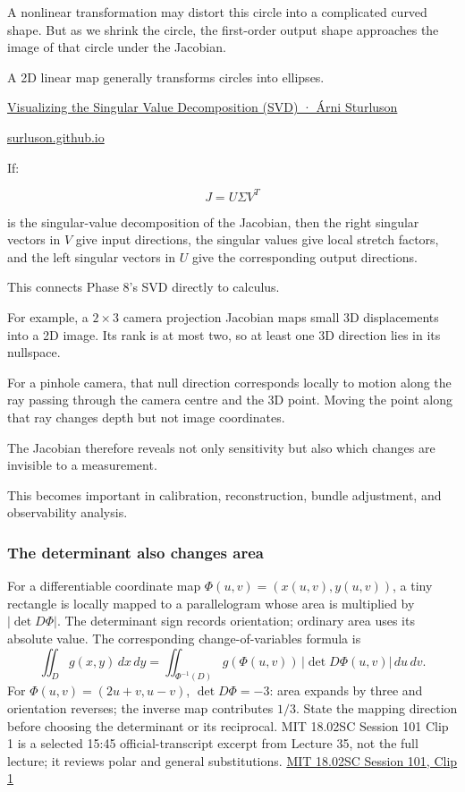 A nonlinear transformation may distort this circle into a complicated curved shape. But as we shrink the circle, the first-order output shape approaches the image of that circle under the Jacobian.

A 2D linear map generally transforms circles into ellipses.

\href{https://images.openai.com/static-rsc-4/snh-e19GotRQocePDuoqQRldKi909Wv3Ghn6oy7qF4vh-DmEyMU0aOYOrfy6z9hhcRviS00W0fgYnoU6OnDjUJDqI_E0F7jsn5R4hOfc-E6wNdPAnQTW2qd7NnlpFlxmOrTHzMeuPAv3DS5XmKmuNKw19bkuYGpa9H3DCFJSaeA?purpose=inline}{Visualizing the Singular Value Decomposition (SVD) · Árni Sturluson}

\href{https://surluson.github.io/blog/2021/01/11/visualizing-svd/?utm_source=chatgpt.com}{surluson.github.io}

If:

\[
J=U\Sigma V^T
\]

is the singular-value decomposition of the Jacobian, then the right singular vectors in \(V\) give input directions, the singular values give local stretch factors, and the left singular vectors in \(U\) give the corresponding output directions.

This connects Phase 8's SVD directly to calculus.

For example, a \(2\times3\) camera projection Jacobian maps small 3D displacements into a 2D image. Its rank is at most two, so at least one 3D direction lies in its nullspace.

For a pinhole camera, that null direction corresponds locally to motion along the ray passing through the camera centre and the 3D point. Moving the point along that ray changes depth but not image coordinates.

The Jacobian therefore reveals not only sensitivity but also which changes are invisible to a measurement.

This becomes important in calibration, reconstruction, bundle adjustment, and observability analysis.

\subsubsection{The determinant also changes area}\label{02-foundations-ii-ch021-the-determinant-also-changes-area}

For a differentiable coordinate map \(\Phi(u,v)=(x(u,v),y(u,v))\), a tiny rectangle is locally mapped to a parallelogram whose area is multiplied by \(|\det D\Phi|\). The determinant sign records orientation; ordinary area uses its absolute value. The corresponding change-of-variables formula is \[
\iint_D g(x,y)\,dx\,dy
=
\iint_{\Phi^{-1}(D)}g(\Phi(u,v))\,|\det D\Phi(u,v)|\,du\,dv.
\] For \(\Phi(u,v)=(2u+v,u-v)\), \(\det D\Phi=-3\): area expands by three and orientation reverses; the inverse map contributes \(1/3\). State the mapping direction before choosing the determinant or its reciprocal. MIT 18.02SC Session 101 Clip 1 is a selected 15:45 official-transcript excerpt from Lecture 35, not the full lecture; it reviews polar and general substitutions. \href{https://ocw.mit.edu/courses/18-02sc-multivariable-calculus-fall-2010/resources/clip-1-double-integrals-jacobian-triple-integrals/}{MIT 18.02SC Session 101, Clip 1}

